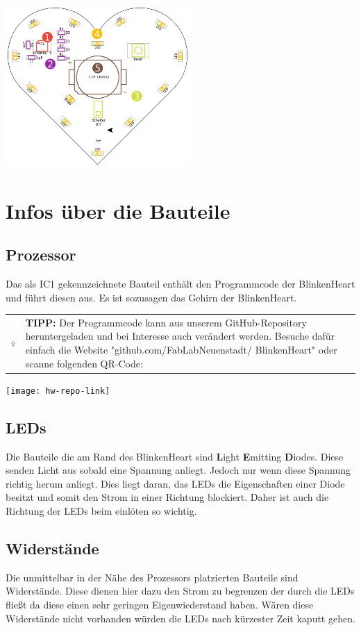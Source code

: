 \documentclass{article} %
\newcommand{\hintbox}[1]{
\begin{center}
	\begin{tabularx}{\linewidth}{
			>{\columncolor{hintbackground}}c
			>{\columncolor{hintbackground}}X}
		\raisebox{\dimexpr2\baselineskip-\height/2-\tabcolsep}
		{\includegraphics[width=1cm]{icons/002-technology}}&
		\raisebox{\tabcolsep}{\strut}\textbf{TIPP:} #1\raisebox{-\tabcolsep}{\strut}
	\end{tabularx}
\end{center}
}
\begin{document}
\begin{center}
	\includegraphics[width=7cm]{pcb/solder_order}
\end{center}

\newpage
\section{Infos über die Bauteile}
\subsection{Prozessor}
Das als IC1 gekennzeichnete Bauteil enthält den Programmcode der BlinkenHeart und führt diesen aus. Es ist sozusagen das Gehirn der BlinkenHeart.

\hintbox{Der Programmcode kann aus unserem GitHub-Repository heruntergeladen und bei Interesse auch verändert werden. Besuche dafür einfach die Website "github.com/FabLabNeuenstadt/ BlinkenHeart" oder scanne folgenden QR-Code:}
\begin{center}
	\texttt{[image: hw-repo-link]}
\end{center}

\subsection{LEDs}
Die Bauteile die am Rand des BlinkenHeart sind
\textbf{L}ight \textbf{E}mitting \textbf{D}iodes.
Diese senden Licht aus sobald eine Spannung anliegt.
Jedoch nur wenn diese Spannung richtig herum anliegt.
Dies liegt daran, das LEDs die Eigenschaften einer Diode besitzt und
somit den Strom in einer Richtung blockiert.
Daher ist auch die Richtung der LEDs beim einlöten so wichtig.

\subsection{Widerstände}
Die unmittelbar in der Nähe des Prozessors platzierten Bauteile sind Widerstände. Diese dienen hier dazu den Strom zu begrenzen der durch die LEDs fließt da diese einen sehr geringen Eigenwiederstand haben. Wären diese Widerstände nicht vorhanden würden die LEDs nach kürzester Zeit kaputt gehen.
\end{document}
